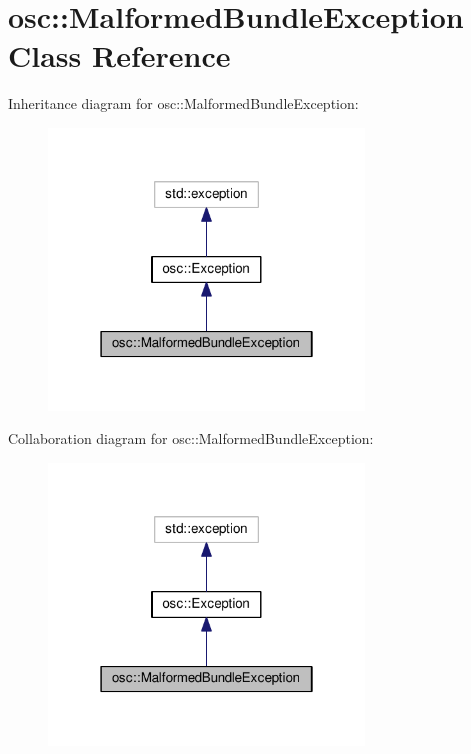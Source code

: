 \hypertarget{classosc_1_1_malformed_bundle_exception}{}\section{osc\+:\+:Malformed\+Bundle\+Exception Class Reference}
\label{classosc_1_1_malformed_bundle_exception}


Inheritance diagram for osc\+:\+:Malformed\+Bundle\+Exception\+:\nopagebreak
\begin{figure}[H]
\begin{center}
\leavevmode
\includegraphics[width=238pt]{classosc_1_1_malformed_bundle_exception__inherit__graph}
\end{center}
\end{figure}


Collaboration diagram for osc\+:\+:Malformed\+Bundle\+Exception\+:\nopagebreak
\begin{figure}[H]
\begin{center}
\leavevmode
\includegraphics[width=238pt]{classosc_1_1_malformed_bundle_exception__coll__graph}
\end{center}
\end{figure}
